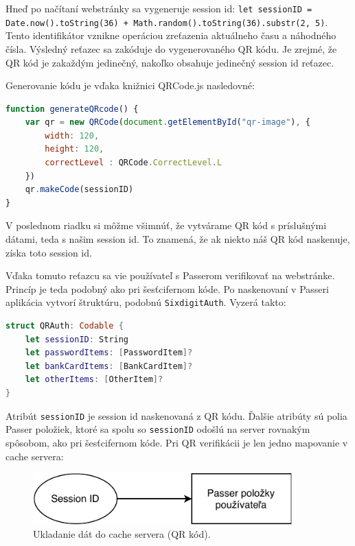 \begin{sloppypar}
    Hneď po načítaní webstránky sa vygeneruje session id: \texttt{let sessionID = Date.now().toString(36) + Math.random().toString(36).substr(2, 5)}. Tento identifikátor vznikne operáciou zreťazenia aktuálneho času a náhodného čísla. Výsledný reťazec sa zakóduje do vygenerovaného QR kódu. Je zrejmé, že QR kód je zakaždým jedinečný, nakoľko obsahuje jedinečný session id reťazec.
\end{sloppypar}

Generovanie kódu je vďaka knižnici QRCode.js nasledovné: 
\newline
\begin{lstlisting}[language=JavaScript, basicstyle=\small]
function generateQRcode() {
    var qr = new QRCode(document.getElementById("qr-image"), {
        width: 120,
        height: 120,
        correctLevel : QRCode.CorrectLevel.L
    })
    qr.makeCode(sessionID)
}
\end{lstlisting}
\leavevmode\newline
\noindent V poslednom riadku si môžme všimnúť, že vytvárame QR kód s príslušnými dátami, teda s našim session id. To znamená, že ak niekto náš QR kód naskenuje, získa toto session id.

Vďaka tomuto reťazcu sa vie používateľ s Passerom verifikovať na webstránke. Princíp je teda podobný ako pri šesťcifernom kóde. Po naskenovaní v Passeri aplikácia vytvorí štruktúru, podobnú \texttt{SixdigitAuth}. Vyzerá takto:
\newline
\begin{lstlisting}[language=Swift, basicstyle=\small]
struct QRAuth: Codable {
    let sessionID: String
    let passwordItems: [PasswordItem]?
    let bankCardItems: [BankCardItem]?
    let otherItems: [OtherItem]?
}
\end{lstlisting}
\leavevmode\newline
\noindent Atribút \texttt{sessionID} je session id naskenovaná z QR kódu. Ďalšie atribúty sú polia Passer položiek, ktoré sa spolu so \texttt{sessionID} odošlú na server rovnakým spôsobom, ako pri šesťcifernom kóde. Pri QR verifikácii je len jedno mapovanie v cache servera: 
\newline
\begin{figure}[H]
  \centering
  \includegraphics[width=10cm]{img/cache-diagramQR.pdf}
  \caption{Ukladanie dát do cache servera (QR kód).}
  \label{cache-diagramQR}
\end{figure}

